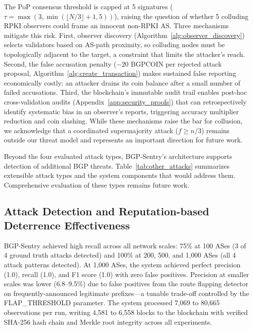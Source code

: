 The PoP consensus threshold is capped at 5 signatures ($\tau = \max(3, \min(\lfloor N/3 \rfloor + 1, 5))$), raising the question of whether 5 colluding RPKI observers could frame an innocent non-RPKI AS. Three mechanisms mitigate this risk. First, observer discovery (Algorithm~\ref{alg:observer_discovery}) selects validators based on AS-path proximity, so colluding nodes must be topologically adjacent to the target, a constraint that limits the attacker's reach. Second, the false accusation penalty ($-20$ BGPCOIN per rejected attack proposal, Algorithm~\ref{alg:create_transaction}) makes sustained false reporting economically costly: an attacker drains its coin balance after a small number of failed accusations. Third, the blockchain's immutable audit trail enables post-hoc cross-validation audits (Appendix~\ref{app:security_proofs}) that can retrospectively identify systematic bias in an observer's reports, triggering accuracy multiplier reduction and coin slashing. While these mechanisms raise the bar for collusion, we acknowledge that a coordinated supermajority attack ($f \geq n/3$) remains outside our threat model and represents an important direction for future work.

Beyond the four evaluated attack types, BGP-Sentry's architecture supports detection of additional BGP threats. Table~\ref{tab:other_attacks} summarizes extensible attack types and the system components that would address them. Comprehensive evaluation of these types remains future work.




\subsection{Attack Detection and Reputation-based Deterrence Effectiveness}
\label{subsec:attack_detection_effectiveness}

BGP-Sentry achieved high recall across all network scales: 75\% at 100 ASes (3 of 4 ground truth attacks detected) and 100\% at 200, 500, and 1{,}000 ASes (all 4 attack patterns detected). {\color{red}At 1{,}000 ASes, the system achieved perfect precision (1.0), recall (1.0), and F1 score (1.0) with zero false positives.} Precision at smaller scales was lower (6.8--9.5\%) due to false positives from the route flapping detector on frequently-announced legitimate prefixes---a tunable trade-off controlled by the FLAP\_THRESHOLD parameter. The system processed 7,069 to 80,665 observations per run, writing 4,581 to 6,558 blocks to the blockchain with verified SHA-256 hash chain and Merkle root integrity across all experiments.

